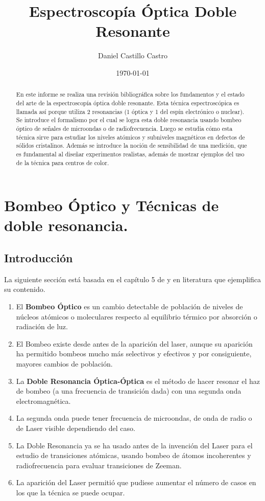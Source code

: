 \documentclass[aps,rmp,reprint,longbibliography]{revtex4-1}
\begin{document}
\title{Espectroscopía Óptica Doble Resonante}
\author{Daniel Castillo Castro}
\date{\today{}}
\begin{abstract}
   En este informe se realiza una revisión bibliográfica sobre los fundamentos y el estado del arte de la espectroscopía óptica doble resonante. Esta técnica espectroscópica es llamada así porque utiliza 2 resonancias (1 óptica y 1 del espín electrónico o nuclear). Se introduce el formalismo por el cual se logra esta doble resonancia usando bombeo óptico de señales de microondas o de radiofrecuencia. Luego se estudia cómo esta técnica sirve para estudiar los niveles atómicos y subniveles magnéticos en defectos de sólidos cristalinos. Además se introduce la noción de sensibilidad de una medición, que es fundamental al diseñar experimentos realistas, además de mostrar ejemplos del uso de la técnica para centros de color.
\end{abstract}
\maketitle
\tableofcontents{}
\section{Bombeo Óptico y Técnicas de doble resonancia.}
\subsection{Introducción}
La siguiente sección está basada en el capítulo 5 de \cite{b2} y en literatura que ejemplifica su contenido.
\begin{enumerate}
\item El \textbf{Bombeo Óptico} es un cambio detectable de población de niveles de núcleos atómicos o moleculares respecto al equilibrio térmico por absorción o radiación de luz.
\item El Bombeo existe desde antes de la aparición del laser, aunque su aparición ha permitido bombeos mucho más selectivos y efectivos y por consiguiente, mayores cambios de población.
\item La \textbf{Doble Resonancia Óptica-Óptica} es el método de hacer resonar el haz de bombeo (a una frecuencia de transición dada) con una segunda onda electromagnética.
\item La segunda onda puede tener frecuencia de microondas, de onda de radio o de Laser visible dependiendo del caso.
\item La Doble Resonancia ya se ha usado antes de la invención del Laser para el estudio de transiciones atómicas, usando bombeo de átomos incoherentes y radiofrecuencia para evaluar transiciones de Zeeman.
\item La aparición del Laser permitió que pudiese aumentar el número de casos en los que la técnica se puede ocupar.
\end{enumerate}
\end{document}
